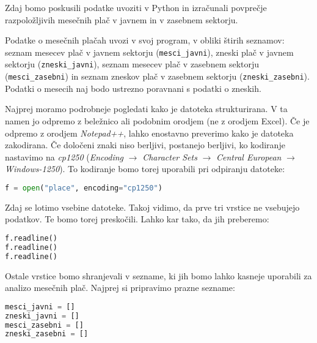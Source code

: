 Zdaj bomo poskusili podatke uvoziti v Python in izračunali povprečje razpoložljivih mesečnih plač v javnem in v zasebnem sektorju.
\begin{zgled}
Podatke o mesečnih plačah uvozi v svoj program, v obliki štirih seznamov: seznam mesecev plač v javnem sektorju (\texttt{mesci\_javni}), zneski plač v javnem sektorju (\texttt{zneski\_javni}), seznam mesecev plač v zasebnem sektorju (\texttt{mesci\_zasebni}) in seznam zneskov plač v zasebnem sektorju (\texttt{zneski\_zasebni}). Podatki o mesecih naj bodo ustrezno poravnani s podatki o zneskih.
\end{zgled}
\begin{resitev}
Najprej moramo podrobneje pogledati kako je datoteka strukturirana. V ta namen jo odpremo z beležnico ali podobnim orodjem (ne z orodjem Excel). Če je odpremo z orodjem \emph{Notepad++}, lahko enostavno preverimo kako je datoteka zakodirana. Če določeni znaki niso berljivi, postanejo berljivi, ko kodiranje nastavimo na \emph{cp1250} (\emph{Encoding} $\rightarrow$ \emph{Character Sets} $\rightarrow$ \emph{Central European} $\rightarrow$ \emph{Windows-1250}). To kodiranje bomo torej uporabili pri odpiranju datoteke:
\begin{lstlisting}[language=Python, showstringspaces=false]
f = open("place", encoding="cp1250")
\end{lstlisting}

Zdaj se lotimo vsebine datoteke. Takoj vidimo, da prve tri vrstice ne vsebujejo podatkov. Te bomo torej preskočili. Lahko kar tako, da jih preberemo:
\begin{lstlisting}[language=Python, showstringspaces=false]
f.readline()
f.readline()
f.readline()
\end{lstlisting}

Ostale vrstice bomo shranjevali v sezname, ki jih bomo lahko kasneje uporabili za analizo mesečnih plač. Najprej si pripravimo prazne sezname:
\begin{lstlisting}[language=Python, showstringspaces=false]
mesci_javni = []
zneski_javni = []
mesci_zasebni = []
zneski_zasebni = []
\end{lstlisting}


\end{resitev}
